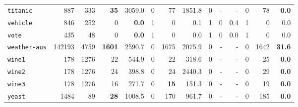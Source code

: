 \begin{tabular}{lccrrrrrrrrrrr}
\texttt{titanic} & \multicolumn{1}{r}{887} & \multicolumn{1}{r}{333}  & \textbf{35} & 3059.0 & 0 & 77 & 1851.8 & 0 & - & - & 0 & 78 & \textbf{0.0}\\
\texttt{vehicle} & \multicolumn{1}{r}{846} & \multicolumn{1}{r}{252}  & 0 & \textbf{0.0} & 1 & 0 & 0.1 & 1 & 0 & 0.4 & 1 & 0 & 0.0\\
\texttt{vote} & \multicolumn{1}{r}{435} & \multicolumn{1}{r}{48}  & 0 & \textbf{0.0} & 1 & 0 & 0.0 & 1 & 0 & 0.0 & 1 & 0 & 0.0\\
\texttt{weather-aus} & \multicolumn{1}{r}{142193} & \multicolumn{1}{r}{4759}  & \textbf{1601} & 2590.7 & 0 & 1675 & 2075.9 & 0 & - & - & 0 & 1642 & \textbf{31.6}\\
\texttt{wine1} & \multicolumn{1}{r}{178} & \multicolumn{1}{r}{1276}  & 22 & 544.9 & 0 & 22 & 318.6 & 0 & - & - & 0 & 25 & \textbf{0.0}\\
\texttt{wine2} & \multicolumn{1}{r}{178} & \multicolumn{1}{r}{1276}  & 24 & 398.8 & 0 & 24 & 2440.3 & 0 & - & - & 0 & 29 & \textbf{0.0}\\
\texttt{wine3} & \multicolumn{1}{r}{178} & \multicolumn{1}{r}{1276}  & 16 & 271.7 & 0 & \textbf{15} & 151.3 & 0 & - & - & 0 & 19 & \textbf{0.0}\\
\texttt{yeast} & \multicolumn{1}{r}{1484} & \multicolumn{1}{r}{89}  & \textbf{28} & 1008.5 & 0 & 170 & 961.7 & 0 & - & - & 0 & 185 & \textbf{0.0}\\
\bottomrule
\end{tabular}
